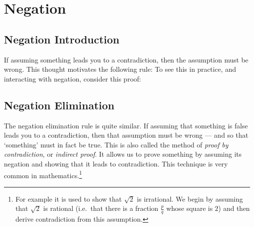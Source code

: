 \section{Negation}

\subsection{Negation Introduction}
If assuming something leads you to a contradiction, then the assumption must be wrong. This thought motivates the following rule:
To see this in practice, and interacting with negation, consider this proof:
	\begin{pf}
		\open
		\close
	\end{pf}


\subsection{Negation Elimination} %

The negation elimination rule is quite similar. If assuming that something is false leads you to a contradiction, then that assumption must be wrong --- and so that `something' must in fact be true.
This is also called the method of \emph{proof by contradiction}, or \emph{indirect proof}. It allows us to prove something by assuming its negation and showing that it leads to contradiction. This technique is very common in mathematics.\footnote{
For example it is used to show that $\sqrt{2}$ is irrational.  We begin by assuming that $\sqrt{2}$ is rational (i.e.~that there is a fraction $\frac{p}{q}$ whose square is $2$) and then derive contradiction from this assumption.
}


